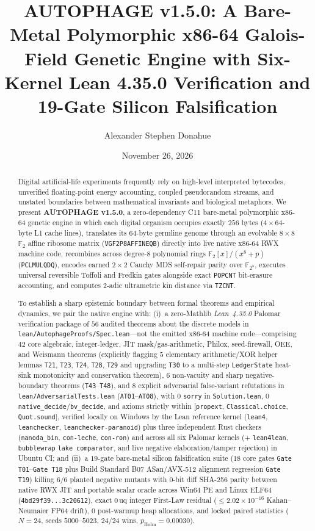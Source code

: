 \documentclass[11pt,reqno]{amsart}
\title[AUTOPHAGE v1.5.0]{AUTOPHAGE v1.5.0: A Bare-Metal Polymorphic x86-64 Galois-Field Genetic Engine with Six-Kernel Lean 4.35.0 Verification and 19-Gate Silicon Falsification}
\author{Alexander Stephen Donahue}
\date{November 26, 2026}
\theoremstyle{plain}
\theoremstyle{definition}
\theoremstyle{remark}
\newcommand{\code}[1]{{\footnotesize\nolinkurl{#1}}}
\begin{document}
\begin{abstract}
Digital artificial-life experiments frequently rely on high-level interpreted bytecodes, unverified floating-point energy accounting, coupled pseudorandom streams, and unstated boundaries between mathematical invariants and biological metaphors. We present \textbf{AUTOPHAGE v1.5.0}, a zero-dependency C11 bare-metal polymorphic x86-64 genetic engine in which each digital organism occupies exactly $256$ bytes ($4 \times 64$-byte L1 cache lines), translates its $64$-byte germline genome through an evolvable $8 \times 8$ $\mathbb{F}_2$ affine ribosome matrix (\code{VGF2P8AFFINEQB}) directly into live native x86-64 RWX machine code, recombines across degree-$8$ polynomial rings $\mathbb{F}_2[x]/(x^8+p)$ (\code{PCLMULQDQ}), encodes earned $2 \times 2$ Cauchy MDS self-repair parity over $\mathbb{F}_{2^8}$, executes universal reversible Toffoli and Fredkin gates alongside exact \code{POPCNT} bit-erasure accounting, and computes $2$-adic ultrametric kin distance via \code{TZCNT}.

To establish a sharp epistemic boundary between formal theorems and empirical dynamics, we pair the native engine with: (i)~a zero-Mathlib \emph{Lean~4.35.0} Palomar verification package of $56$ audited theorems about the discrete models in \code{lean/AutophageProofs/Spec.lean}---not the emitted x86-64 machine code---comprising $42$ core algebraic, integer-ledger, JIT mask/gas-arithmetic, Philox, seed-firewall, OEE, and Weismann theorems (explicitly flagging $5$ elementary arithmetic/XOR helper lemmas \code{T21}, \code{T23}, \code{T24}, \code{T28}, \code{T29} and upgrading \code{T30} to a multi-step \code{LedgerState} heat-sink monotonicity and conservation theorem), $6$ non-vacuity and sharp negative-boundary theorems (\code{T43}--\code{T48}), and $8$ explicit adversarial false-variant refutations in \code{lean/AdversarialTests.lean} (\code{AT01}--\code{AT08}), with $0$ \code{sorry} in \code{Solution.lean}, $0$ \code{native_decide}/\code{bv_decide}, and axioms strictly within [\code{propext}, \code{Classical.choice}, \code{Quot.sound}], verified locally on Windows by the Lean reference kernel (\code{lean4}, \code{leanchecker}, \code{leanchecker-paranoid}) plus three independent Rust checkers (\code{nanoda_bin}, \code{con-leche}, \code{con-ron}) and across all six Palomar kernels (+ \code{lean4lean}, \code{bubblewrap} \code{lake comparator}, and live negative elaboration/tamper rejection) in Ubuntu CI; and (ii)~a $19$-gate bare-metal silicon falsification suite ($18$ core gates \code{Gate T01}--\code{Gate T18} plus Build Standard B07 ASan/AVX-512 alignment regression \code{Gate T19}) killing $6/6$ planted negative mutants with $0$-bit diff SHA-256 parity between native RWX JIT and portable scalar oracle across Win64 PE and Linux ELF64 (\code{4bd29f39...3c20612}), exact $0\,\mathrm{uq}$ integer First-Law residual ($\le 2.02 \times 10^{-16}$ Kahan--Neumaier FP64 drift), $0$ post-warmup heap allocations, and locked paired statistics ($N=24$, seeds $5000$--$5023$, $24/24$ wins, $p_{\mathrm{Holm}} = 0.00030$).


\end{abstract}
\end{document}
